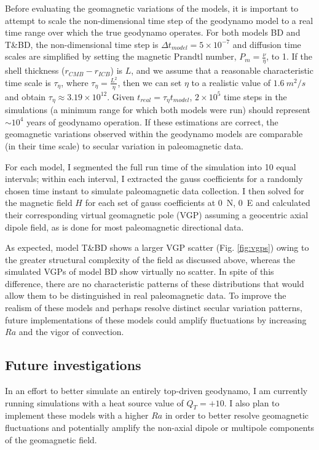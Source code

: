 \documentclass[12pt,letterpaper]{article}
\begin{document}
Before evaluating the geomagnetic variations of the models, it is important to attempt to scale the non-dimensional time step of the geodynamo model to a real time range over which the true geodynamo operates. For both models BD and T\&BD, the non-dimensional time step is $\Delta t_{model}=5\times10^{-7}$ and diffusion time scales are simplified by setting the magnetic Prandtl number, $P_m=\frac{\nu}{\eta}$, to 1. If the shell thickness ($r_{CMB}-r_{ICB}$) is $L$, and we assume that a reasonable characteristic time scale is $\tau_{\eta}$, where $\tau_{\eta} = \frac{L^2}{\eta}$, then we can set $\eta$ to a realistic value of $1.6\ m^2/s$ and obtain $\tau_{\eta}\approx 3.19\times10^{12}$. Given $t_{real}=\tau_{\eta} t_{model}$, $2\times10^5$ time steps in the simulations (a minimum range for which both models were run) should represent $\sim10^4$ years of geodynamo operation. If these estimations are correct, the geomagnetic variations observed within the geodynamo models are comparable (in their time scale) to secular variation in paleomagnetic data.

For each model, I segmented the full run time of the simulation into 10 equal intervals; within each interval, I extracted the gauss coefficients for a randomly chosen time instant to simulate paleomagnetic data collection. I then solved for the magnetic field $H$ for each set of gauss coefficients at 0\textdegree\ N, 0\textdegree\ E and calculated their corresponding virtual geomagnetic pole (VGP) assuming a geocentric axial dipole field, as is done for most paleomagnetic directional data. 

As expected, model T\&BD shows a larger VGP scatter (Fig. \ref{fig:vgps}) owing to the greater structural complexity of the field as discussed above, whereas the simulated VGPs of model BD show virtually no scatter. In spite of this difference, there are no characteristic patterns of these distributions that would allow them to be distinguished in real paleomagnetic data. To improve the realism of these models and perhaps resolve distinct secular variation patterns, future implementations of these models could amplify fluctuations by increasing $Ra$ and the vigor of convection. 

\subsection*{Future investigations}
In an effort to better simulate an entirely top-driven geodynamo, I am currently running simulations with a heat source value of $Q_T=+10$. I also plan to implement these models with a higher $Ra$ in order to better resolve geomagnetic fluctuations and potentially amplify the non-axial dipole or multipole components of the geomagnetic field.
\end{document}
